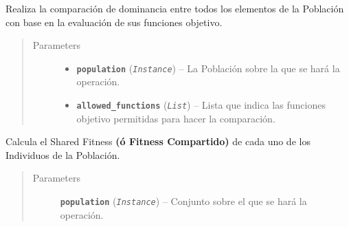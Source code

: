 \documentclass[letterpaper,10pt,english]{sphinxmanual}
\begin{document}
\begin{fulllineitems}

\begin{fulllineitems}
\label{Model/Community/Community:Model.Community.Community.Community.calculate_population_pareto_dominance}
Realiza la comparación de dominancia entre todos los elementos de la Población con base
en la evaluación de sus funciones objetivo.
\begin{quote}\begin{description}
\item[{Parameters}] \leavevmode\begin{itemize}
\item {} 
\textbf{\texttt{population}} (\emph{\texttt{Instance}}) -- La Población sobre la que se hará la operación.

\item {} 
\textbf{\texttt{allowed\_functions}} (\emph{\texttt{List}}) -- Lista que indica las funciones objetivo permitidas para hacer la 
comparación.

\end{itemize}

\end{description}\end{quote}

\end{fulllineitems}


\begin{fulllineitems}
\label{Model/Community/Community:Model.Community.Community.Community.calculate_population_shared_fitness}
Calcula el Shared Fitness \textbf{(ó Fitness Compartido)} de cada uno
de los Individuos de la Población.
\begin{quote}\begin{description}
\item[{Parameters}] \leavevmode
\textbf{\texttt{population}} (\emph{\texttt{Instance}}) -- Conjunto sobre el que se hará la operación.

\end{description}\end{quote}

\end{fulllineitems}


\end{fulllineitems}
\end{document}
